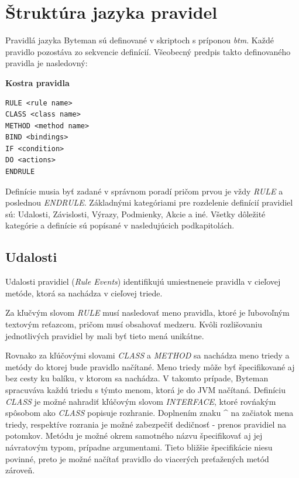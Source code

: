 \documentclass[11pt,final,oneside]{fithesis}
\newenvironment{example}[1]
{
\vspace{3mm}
\noindent\textbf{#1}
\vspace{2mm}
}
{
\vspace{3mm}
}
\begin{document}
\section{Štruktúra jazyka pravidel}
Pravidlá jazyka Byteman sú definované v skriptoch s príponou \textit{btm}.
Každé pravidlo pozostáva zo sekvencie definícií. Všeobecný predpis takto
definovaného pravidla je nasledovný:

\begin{example}{Kostra pravidla}
\begin{verbatim}
RULE <rule name>
CLASS <class name>
METHOD <method name>
BIND <bindings>
IF <condition>
DO <actions>
ENDRULE
\end{verbatim}
\end{example}

Definície musia byť zadané v správnom poradí pričom prvou je vždy \textit{RULE} a poslednou \textit{ENDRULE}. Základnými kategóriami pre rozdelenie definícií pravidiel sú: Udalosti, Závislosti, Výrazy, Podmienky, Akcie a iné. Všetky dôležité kategórie a definície sú popísané v nasledujúcich podkapitolách.

\subsection{Udalosti}
Udalosti pravidiel (\textit{Rule Events}) identifikujú umiestneneie pravidla v
cieľovej metóde, ktorá sa nachádza v cieľovej triede.

Za kľučvým slovom \textit{RULE} musí nasledovať meno pravidla, ktoré je ľubovoľným textovým reťazcom, pričom musí obsahovať medzeru. Kvôli rozlišovaniu jednotlivých pravidiel by mali byť tieto mená unikátne.

Rovnako za kľúčovými slovami \textit{CLASS} a \textit{METHOD} sa nachádza meno triedy a metódy do ktorej bude pravidlo načítané. Meno triedy môže byť špecifikované aj bez cesty ku balíku, v ktorom sa nachádza. V takomto prípade, Byteman spracuváva každú triedu s týmto menom, ktorá je do JVM načítaná. Definíciu \textit{CLASS} je možné nahradiť kľúčovým slovom
\textit{INTERFACE}, ktoré rovńakým spôsobom ako \textit{CLASS} popisuje rozhranie. Doplnením znaku ^ na začiatok mena triedy, respektíve rozrania je možné zabezpečiť dedičnosť - prenos pravidiel na potomkov. Metódu je možné okrem samotného názvu špecifikovať aj jej návratovým typom, prípadne
argumentami. Tieto bližšie špecifikácie niesu povinné, preto je možné načítať pravidlo do viacerých preťažených metód zároveň.
\end{document}
